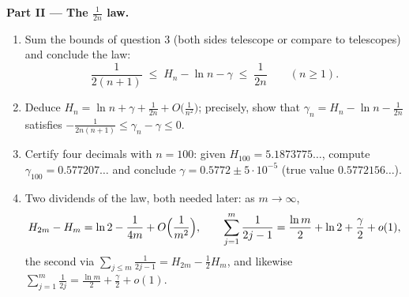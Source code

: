 \begin{problem}[{Weekend problem --- $H_n = \ln n + \gamma +
\frac{1}{2n} + O(n^{-2})$, and rearranging $1 - \frac12 +
\frac13 - \dots$ to $\frac{\ln 2}{2}$}]
\medskip
\noindent\textbf{Part II --- The $\frac{1}{2n}$ law.}
\begin{enumerate}[resume]
  \item Sum the bounds of question 3 (both sides telescope or
        compare to telescopes) and conclude the law:
        \[
        \frac{1}{2(n+1)} \;\leq\; H_n - \ln n - \gamma \;\leq\;
        \frac{1}{2n} \qquad (n \geq 1).
        \]
  \item Deduce $H_n = \ln n + \gamma + \frac{1}{2n} +
        O\bigl(\frac{1}{n^2}\bigr)$; precisely, show that
        $\gamma_n = H_n - \ln n - \frac{1}{2n}$ satisfies
        $-\frac{1}{2n(n+1)} \leq \gamma_n - \gamma \leq 0$.
  \item Certify four decimals with $n = 100$: given $H_{100} =
        5.1873775\dots$, compute $\gamma_{100} = 0.577207\dots$
        and conclude $\gamma = 0.5772 \pm 5\cdot10^{-5}$ (true
        value $0.5772156\dots$).
  \item Two dividends of the law, both needed later: as $m \to
        \infty$,
        \[
        H_{2m} - H_m = \ln 2 - \frac{1}{4m} +
        O\Bigl(\frac{1}{m^2}\Bigr),
        \qquad
        \sum_{j=1}^{m} \frac{1}{2j-1} = \frac{\ln m}{2} + \ln 2
        + \frac\gamma2 + o(1) ,
        \]
        the second via $\sum_{j \leq m} \frac{1}{2j-1} = H_{2m}
        - \frac12 H_m$, and likewise $\sum_{j=1}^{m}
        \frac{1}{2j} = \frac{\ln m}{2} + \frac\gamma2 + o(1)$.
\end{enumerate}


\end{problem}
